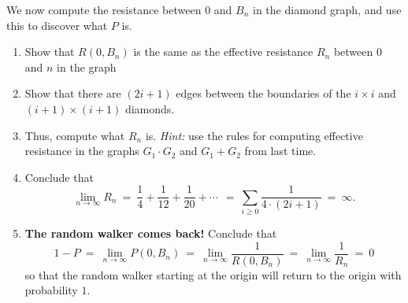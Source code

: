 \documentclass[11pt,fleqn]{book} %
\begin{document}
\begin{problem}
  We now compute the resistance between $0$ and $B_n$ in the diamond graph, and use this to discover what $P$ is.

  \begin{enumerate}[label =\alph*.]
   \item Show that $R(0,B_n)$ is the same as the effective resistance $R_n$ between $0$ and $n$ in the graph 
   \begin{center}
    \end{center}
    \item Show that there are $(2i+1)$ edges between the boundaries of the $i\times i$ and $(i+1)\times (i+1)$ diamonds. 
    \item Thus, compute what $R_n$ is. \textit{Hint:} use the rules for computing effective resistance in the graphs $G_1\cdot G_2$ and $G_1+G_2$ from last time.
    \item Conclude that 
    $$\lim_{n \to \infty}R_n \ = \ \frac{1}{4} + \frac{1}{12} + \frac{1}{20}+ \cdots \ \ = \ \sum_{i \ge 0} \frac{1}{4\cdot (2i+1)} \ = \ \infty.$$
    \item \textbf{The random walker comes back!} Conclude that 
    $$1-P \ = \ \lim_{n \to \infty}P(0,B_n) \ = \ \lim_{n \to \infty} \frac{1}{R(0,B_n)} \ = \ \lim_{n \to \infty} \frac{1}{R_n} \ = \ 0$$
    so that the random walker starting at the origin will return to the origin with probability $1$.
  \end{enumerate}
\end{problem}
\end{document}

